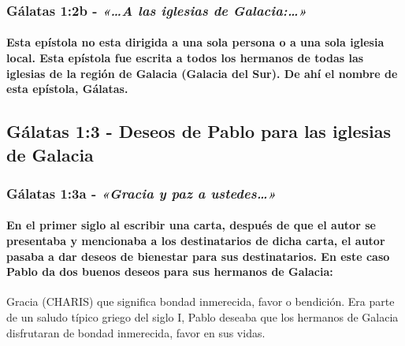 \documentclass[11a pt,twoside]{article}
\newcommand{\scripture}[1]{%
  {\fontsize{12pt}{16pt}\selectfont\ScriptureFont\itshape #1}%
}
\let\oldsubsection\subsection
\renewcommand{\subsection}{\needspace{5\baselineskip}\oldsubsection}
\let\oldsubsubsection\subsubsection
\renewcommand{\subsubsection}{\needspace{4\baselineskip}\oldsubsubsection}
\let\oldparagraph\paragraph
\renewcommand{\paragraph}{\needspace{3\baselineskip}\oldparagraph}
\begin{document}
\subsubsection{\texorpdfstring{Gálatas 1:2b -
\scripture{«…A las iglesias de Galacia:…»}}{Gálatas 1:2b - }}\label{guxe1latas-12b---a-las-iglesias-de-galacia}

\paragraph{Esta epístola no esta dirigida a una sola persona o a una
sola iglesia local. Esta epístola fue escrita a todos los hermanos de
todas las iglesias de la región de Galacia (Galacia del Sur). De ahí el
nombre de esta epístola,
Gálatas.}\label{esta-epuxedstola-no-esta-dirigida-a-una-sola-persona-o-a-una-sola-iglesia-local.-esta-epuxedstola-fue-escrita-a-todos-los-hermanos-de-todas-las-iglesias-de-la-regiuxf3n-de-galacia-galacia-del-sur.-de-ahuxed-el-nombre-de-esta-epuxedstola-guxe1latas.}

\subsection{Gálatas 1:3 - Deseos de Pablo para las iglesias de
Galacia}\label{guxe1latas-13---deseos-de-pablo-para-las-iglesias-de-galacia}

\subsubsection{\texorpdfstring{Gálatas 1:3a -
\scripture{«Gracia y paz a ustedes…»}}{Gálatas 1:3a - }}\label{guxe1latas-13a---gracia-y-paz-a-ustedes}

\paragraph{En el primer siglo al escribir una carta, después de que el
autor se presentaba y mencionaba a los destinatarios de dicha carta, el
autor pasaba a dar deseos de bienestar para sus destinatarios. En este
caso Pablo da dos buenos deseos para sus hermanos de
Galacia:}\label{en-el-primer-siglo-al-escribir-una-carta-despuuxe9s-de-que-el-autor-se-presentaba-y-mencionaba-a-los-destinatarios-de-dicha-carta-el-autor-pasaba-a-dar-deseos-de-bienestar-para-sus-destinatarios.-en-este-caso-pablo-da-dos-buenos-deseos-para-sus-hermanos-de-galacia}

\begin{center}
\begin{definitionbox}{Gracia (CHARIS)}
que significa bondad inmerecida, favor o bendición. Era parte de un saludo típico griego del siglo I, Pablo deseaba que los hermanos de Galacia disfrutaran de bondad inmerecida, favor en sus vidas.
\end{definitionbox}
\end{center}
\end{document}
